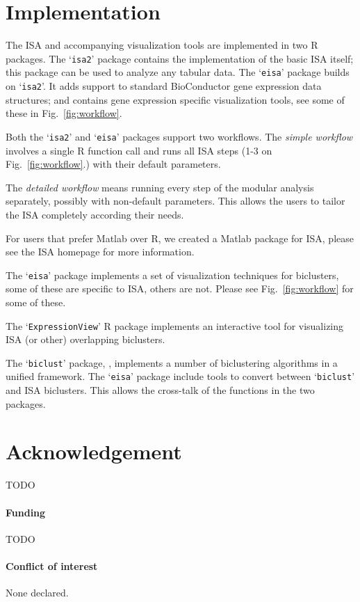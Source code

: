\documentclass{bioinfo}
\newcommand{\Rpackage}[1]{`\texttt{#1}'}
\begin{document}
\section{Implementation}%
\label{sec:implementation}

The ISA and accompanying visualization tools are implemented in two R
packages. The \Rpackage{isa2} package contains the implementation of
the basic ISA itself; this package can be used to analyze any tabular
data. The \Rpackage{eisa} package builds on \Rpackage{isa2}. It adds
support to standard BioConductor gene expression data structures; and
contains gene expression specific visualization tools, see some of
these in Fig.~\ref{fig:workflow}.

Both the \Rpackage{isa2} and \Rpackage{eisa} packages support two
workflows. The \emph{simple workflow} involves a single R function
call and runs all ISA steps (1-3 on Fig.~\ref{fig:workflow}.) with
their default parameters.

The \emph{detailed workflow} means running every step of the modular
analysis separately, possibly with non-default parameters. This allows
the users to tailor the ISA completely according their needs.

For users that prefer Matlab over R, we created a Matlab package for
ISA, please see the ISA homepage for more information.


The \Rpackage{eisa} package implements a set of visualization
techniques for biclusters, some of these are specific to ISA, others
are not. Please see Fig.~\ref{fig:workflow} for some of these.

The \Rpackage{ExpressionView} R package implements an interactive tool
for visualizing ISA (or other) overlapping biclusters.


The \Rpackage{biclust} package, \cite{biclust}, implements a number of
biclustering algorithms in a unified framework. The \Rpackage{eisa}
package include tools to convert between \Rpackage{biclust} and ISA
biclusters. This allows the cross-talk of the functions in the two
packages.

\section*{Acknowledgement}

TODO
\paragraph{Funding\textcolon} TODO
\paragraph{Conflict of interest\textcolon} None declared.



\end{document}
